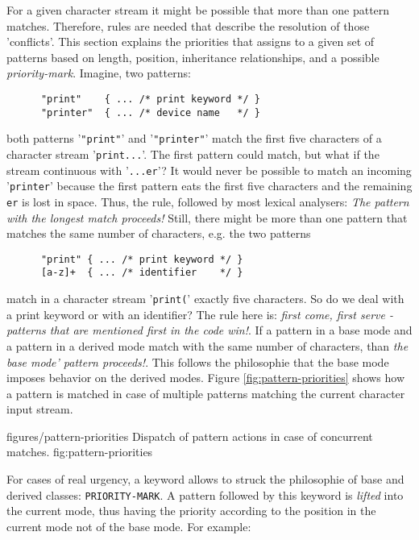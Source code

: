 For a given character stream it might be possible that more than one pattern
matches. Therefore, rules are needed that describe the resolution of those
'conflicts'. This section explains the priorities that {\quex} assigns to a
given set of patterns based on length, position, inheritance relationships,
and a possible {\it priority-mark}. Imagine, two patterns:
\begin{verbatim}
      "print"    { ... /* print keyword */ }
      "printer"  { ... /* device name   */ }
\end{verbatim}
both patterns '{\tt "print"}' and '{\tt "printer"}' match the first five
characters of a character stream '{\tt print...}'.  The first pattern could
match, but what if the stream continuous with '{\tt ...er}'?  It would never
be possible to match an incoming '{\tt printer}' because the first pattern
eats the first five characters and the remaining {\tt er} is lost in space.
Thus, the rule, followed by most lexical analysers: {\it The pattern with the
  longest match proceeds!} Still, there might be more than one pattern 
that matches the same number of characters, e.g. the two patterns
\begin{verbatim}
      "print" { ... /* print keyword */ }
      [a-z]+  { ... /* identifier    */ }
\end{verbatim}
match in a character stream '{\tt print(}' exactly five characters. So do we
deal with a print keyword or with an identifier? The rule here is: {\it first
  come, first serve - patterns that are mentioned first in the code win!}.
If a pattern in a base mode and a pattern in a derived mode match with the
same number of characters, than {\it the base mode' pattern proceeds!}. This
follows the philosophie that the base mode imposes behavior on the derived
modes. Figure \ref{fig:pattern-priorities} shows how a pattern is matched in
case of multiple patterns matching the current character input stream.

\showpic
{figures/pattern-priorities}
{Dispatch of pattern actions in case of concurrent matches.}
{fig:pattern-priorities}


For cases of real urgency, a keyword allows to struck the philosophie of base
and derived classes: {\tt PRIORITY-MARK}. A pattern followed by this keyword
is {\it lifted} into the current mode, thus having the priority according to
the position in the current mode not of the base mode. For example:

